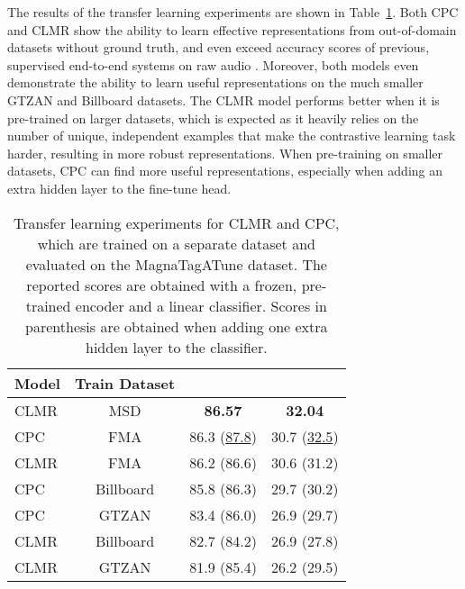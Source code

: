 \documentclass{article}
\begin{document}
The results of the transfer learning experiments are shown in Table~\ref{tab:magnatagatune_results}.
Both CPC and CLMR show the ability to learn effective representations from out-of-domain datasets without ground truth, and even exceed accuracy scores of previous, supervised end-to-end systems on raw audio \cite{dieleman2014end}.
Moreover, both models even demonstrate the ability to learn useful representations on the much smaller GTZAN and Billboard datasets.
The CLMR model performs better when it is pre-trained on larger datasets, which is expected as it heavily relies on the number of unique, independent examples that make the contrastive learning task harder, resulting in more robust representations.
When pre-training on smaller datasets, CPC can find more useful representations, especially when adding an extra hidden layer to the fine-tune head.


\begin{table}[t]
\centering
    \footnotesize
    \begin{tabular}{lccc}
    \toprule
    Model & Train Dataset &  &  \\
    \midrule
    CLMR & MSD &  \textbf{86.57} & \textbf{32.04} \\
    CPC & FMA & 86.3 (\underline{87.8}) & 30.7 (\underline{32.5}) \\
    CLMR & FMA & 86.2 (86.6) & 30.6 (31.2) \\
    CPC & Billboard & 85.8 (86.3) & 29.7 (30.2) \\
    CPC & GTZAN & 83.4 (86.0) & 26.9 (29.7) \\
    CLMR & Billboard & 82.7 (84.2) & 26.9 (27.8) \\
    CLMR & GTZAN & 81.9 (85.4) & 26.2 (29.5) \\
    \bottomrule
    \end{tabular}
    \caption{Transfer learning experiments for CLMR and CPC, which are trained on a separate dataset and evaluated on the Magna\-Tag\-A\-Tune dataset.
The reported scores are obtained with a frozen, pre-trained encoder and a linear classifier. Scores in parenthesis are obtained when adding one extra hidden layer to the classifier.}
    \label{tab:magnatagatune_results}
\end{table}
\end{document}
